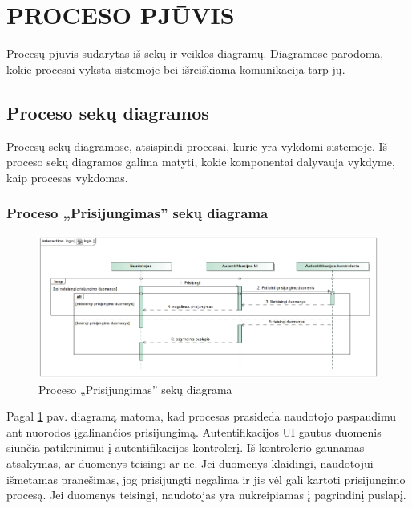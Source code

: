 \documentclass{VUMIFPSkursinis}
\begin{document}
\section{PROCESO PJŪVIS}
Procesų pjūvis sudarytas iš sekų ir veiklos diagramų. Diagramose parodoma, kokie procesai
vyksta sistemoje bei išreiškiama komunikacija tarp jų.
\subsection{Proceso sekų diagramos}
Procesų sekų diagramose, atsispindi procesai, kurie yra vykdomi sistemoje. Iš proceso
sekų diagramos galima matyti, kokie komponentai dalyvauja vykdyme, kaip procesas vykdomas.
\subsubsection{Proceso „Prisijungimas” sekų diagrama}
\begin{figure}[H]
	\centering
	\includegraphics[width=\linewidth]{img/login.jpg}
	\caption{Proceso „Prisijungimas” sekų diagrama}
	\label{fig:login}
\end{figure}
Pagal \ref{fig:login} pav. diagramą matoma, kad procesas prasideda naudotojo paspaudimu ant nuorodos įgalinančios prisijungimą. Autentifikacijos
UI gautus duomenis siunčia patikrinimui į autentifikacijos kontrolerį. Iš kontrolerio
gaunamas atsakymas, ar duomenys teisingi ar ne. Jei duomenys klaidingi, naudotojui išmetamas pranešimas,
jog prisijungti negalima ir jis vėl gali kartoti prisijungimo procesą. Jei duomenys teisingi,
naudotojas yra nukreipiamas į pagrindinį puslapį.
\end{document}

